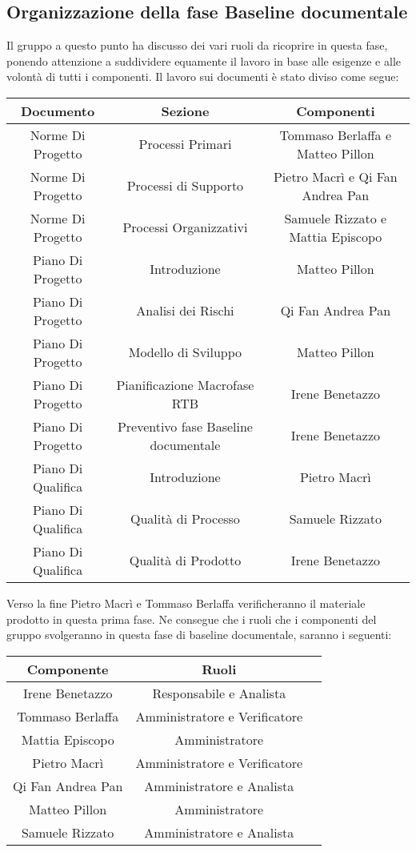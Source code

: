 \subsection{Organizzazione della fase Baseline documentale}
Il gruppo a questo punto ha discusso dei vari ruoli da ricoprire in questa fase, ponendo attenzione a suddividere equamente il lavoro in base alle esigenze e alle volontà di tutti i componenti.
Il lavoro sui documenti è stato diviso come segue:
\begin{center}
\renewcommand{\arraystretch}{1.8}
\begin{tabular}{ |c|c|c| }
\hline
\textbf{Documento} & \textbf{Sezione} & \textbf{Componenti}\\
\hline
Norme Di Progetto & Processi Primari & Tommaso Berlaffa e Matteo Pillon\\
\hline
Norme Di Progetto & Processi di Supporto & Pietro Macrì e Qi Fan Andrea Pan\\
\hline
Norme Di Progetto & Processi Organizzativi & Samuele Rizzato e Mattia Episcopo\\
\hline
Piano Di Progetto & Introduzione & Matteo Pillon\\
\hline
Piano Di Progetto & Analisi dei Rischi & Qi Fan Andrea Pan\\
\hline
Piano Di Progetto & Modello di Sviluppo & Matteo Pillon\\
\hline
Piano Di Progetto & Pianificazione Macrofase RTB & Irene Benetazzo\\
\hline
Piano Di Progetto & Preventivo fase Baseline documentale & Irene Benetazzo\\
\hline
Piano Di Qualifica & Introduzione & Pietro Macrì\\
\hline
Piano Di Qualifica & Qualità di Processo & Samuele Rizzato\\
\hline
Piano Di Qualifica & Qualità di Prodotto & Irene Benetazzo\\
\hline
\end{tabular}
\end{center}
Verso la fine Pietro Macrì e Tommaso Berlaffa verificheranno il materiale prodotto in questa prima fase. \newline
Ne consegue che i ruoli che i componenti del gruppo svolgeranno in questa fase di baseline documentale, saranno i seguenti:
\begin{center}
\renewcommand{\arraystretch}{1.8}
\begin{tabular}{ |c|c|c| }
\hline
\textbf{Componente} & \textbf{Ruoli}\\
\hline
Irene Benetazzo & Responsabile e Analista\\
\hline
Tommaso Berlaffa & Amministratore e Verificatore \\
\hline
Mattia Episcopo & Amministratore\\
\hline
Pietro Macrì & Amministratore e Verificatore\\
\hline
Qi Fan Andrea Pan & Amministratore e Analista\\
\hline
Matteo Pillon & Amministratore \\
\hline
Samuele Rizzato & Amministratore e Analista\\
\hline
\end{tabular}
\end{center}
\newpage
